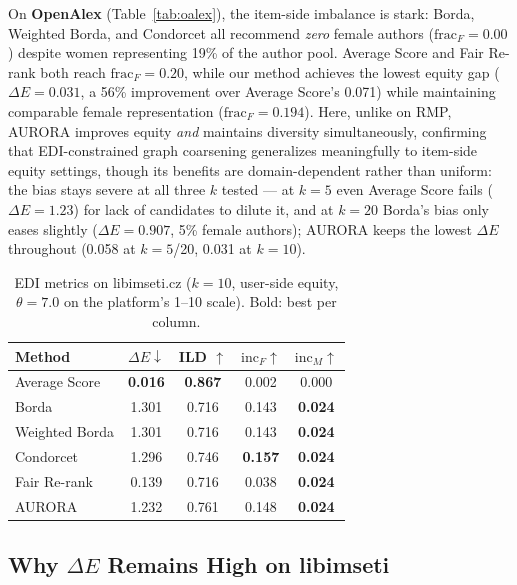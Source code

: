 \documentclass[a4paper,fleqn]{cas-dc}
\begin{document}
On \textbf{OpenAlex} (Table~\ref{tab:oalex}), the item-side imbalance is
stark: Borda, Weighted Borda, and Condorcet all recommend \emph{zero} female
authors ($\mathrm{frac}_F = 0.00$) despite women representing 19\% of the
author pool. Average Score and Fair Re-rank both reach $\mathrm{frac}_F = 0.20$,
while our method achieves the lowest equity gap ($\Delta E = 0.031$, a 56\%
improvement over Average Score's 0.071) while maintaining comparable female
representation ($\mathrm{frac}_F = 0.194$). Here, unlike on RMP, AURORA
improves equity \emph{and} maintains diversity simultaneously, confirming
that EDI-constrained graph coarsening generalizes meaningfully to item-side
equity settings, though its benefits are domain-dependent rather than
uniform: the bias stays severe at all three $k$ tested — at $k=5$ even
Average Score fails ($\Delta E=1.23$) for lack of candidates to dilute
it, and at $k=20$ Borda's bias only eases slightly ($\Delta E=0.907$,
5\% female authors); AURORA keeps the lowest $\Delta E$ throughout
(0.058 at $k=5$/20, 0.031 at $k=10$).

\begin{table}[h!]
\caption{EDI metrics on libimseti.cz ($k=10$, user-side equity, $\theta=7.0$
on the platform's 1--10 scale). Bold: best per column.}
\label{tab:libimseti}
\centering
\begin{tabular}{lcccc}
\hline
Method & $\Delta E \downarrow$ & ILD $\uparrow$ &
$\mathrm{inc}_F \uparrow$ & $\mathrm{inc}_M \uparrow$ \\
\hline
Average Score  & \textbf{0.016} & \textbf{0.867} & 0.002 & 0.000 \\
Borda          & 1.301 & 0.716 & 0.143 & \textbf{0.024} \\
Weighted Borda & 1.301 & 0.716 & 0.143 & \textbf{0.024} \\
Condorcet      & 1.296 & 0.746 & \textbf{0.157} & \textbf{0.024} \\
Fair Re-rank   & 0.139 & 0.716 & 0.038 & \textbf{0.024} \\
AURORA           & 1.232 & 0.761 & 0.148 & \textbf{0.024} \\
\hline
\end{tabular}
\end{table}

\subsection{Why $\Delta E$ Remains High on libimseti}
\label{sec:libimseti-limitation}
\end{document}
